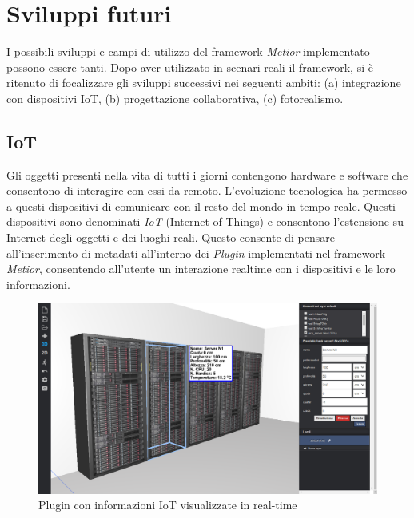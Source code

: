 \section{Sviluppi futuri}
\label{sec:conclusions_section_2}

I possibili sviluppi e campi di utilizzo del framework \emph{Metior} implementato possono essere tanti.
Dopo aver utilizzato in scenari reali il framework, si è ritenuto di focalizzare gli sviluppi successivi nei seguenti ambiti:
(a) integrazione con dispositivi IoT, (b) progettazione collaborativa, (c) fotorealismo.

\subsection{IoT}
\label{sec:conclusions_section_2_sub_1}
Gli oggetti presenti nella vita di tutti i giorni contengono hardware e software
che consentono di interagire con essi da remoto. L'evoluzione tecnologica ha permesso a questi dispositivi
di comunicare con il resto del mondo in tempo reale. Questi dispositivi sono denominati \emph{IoT} (Internet of Things) e
consentono l'estensione su Internet degli oggetti e dei luoghi reali. Questo consente di pensare all'inserimento di
metadati all'interno dei \emph{Plugin} implementati nel framework \emph{Metior},
consentendo all'utente un interazione realtime con i dispositivi e le loro informazioni.\\

\begin{figure}[htbp] %
   \centering
   \includegraphics[width=1\linewidth]{images/iot}
   \caption{Plugin con informazioni IoT visualizzate in real-time}
   \label{fig:iot}
   \end{figure}

\newpage

